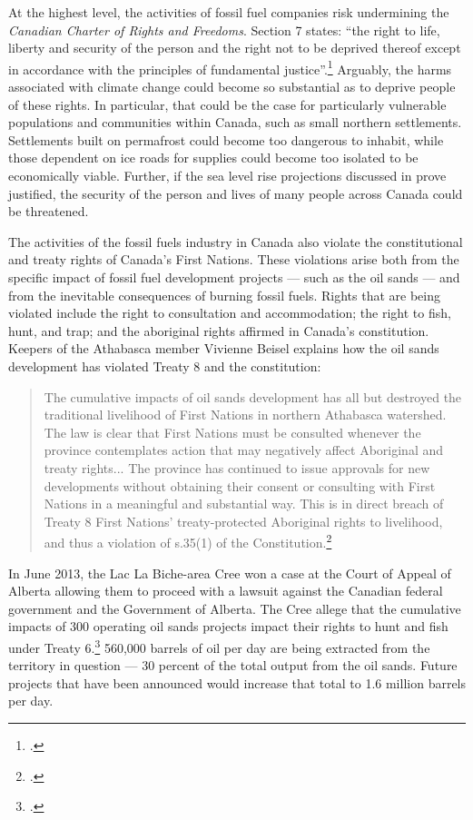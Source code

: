 At the highest level, the activities of fossil fuel companies risk undermining the \emph{Canadian Charter of Rights and Freedoms}.  
Section 7 states: ``the right to life, liberty and security of the person and the right not to be deprived thereof except in accordance with the principles of fundamental justice''.\footcite[][]{CharterRF}
Arguably, the harms associated with climate change could become so substantial as to deprive people of these rights.
In particular, that could be the case for particularly vulnerable populations and communities within Canada, such as small northern settlements.
Settlements built on permafrost could become too dangerous to inhabit, while those dependent on ice roads for supplies could become too isolated to be economically viable.
Further, if the sea level rise projections discussed in  prove justified, the security of the person and lives of many people across Canada could be threatened.



The activities of the fossil fuels industry in Canada also violate the constitutional and treaty rights of Canada's First Nations.
These violations arise both from the specific impact of fossil fuel development projects --- such as the oil sands --- and from the inevitable consequences of burning fossil fuels.
Rights that are being violated include the right to consultation and accommodation; the right to fish, hunt, and trap; and the aboriginal rights affirmed in Canada's constitution.
Keepers of the Athabasca member Vivienne Beisel explains how the oil sands development has violated Treaty 8 and the constitution:
\begin{quote}
The cumulative impacts of oil sands development has all but destroyed the traditional livelihood of First Nations in northern Athabasca watershed. The law is clear that First Nations must be consulted whenever the province contemplates action that may negatively affect Aboriginal and treaty rights... The province has continued to issue approvals for new developments without obtaining their consent or consulting with First Nations in a meaningful and substantial way. This is in direct breach of Treaty 8 First Nations' treaty-protected Aboriginal rights to livelihood, and thus a violation of s.35(1) of the Constitution.\footcite[][]{PassingNoNewOilSandsApprovalsResolution}
\end{quote}
In June 2013, the Lac La Biche-area Cree won a case at the Court of Appeal of Alberta allowing them to proceed with a lawsuit against the Canadian federal government and the Government of Alberta.
The Cree allege that the cumulative impacts of 300 operating oil sands projects impact their rights to hunt and fish under Treaty 6.\footcite[][]{BandWinsTreatyRights}
560,000 barrels of oil per day are being extracted from the territory in question --- 30 percent of the total output from the oil sands.
Future projects that have been announced would increase that total to 1.6 million barrels per day.



